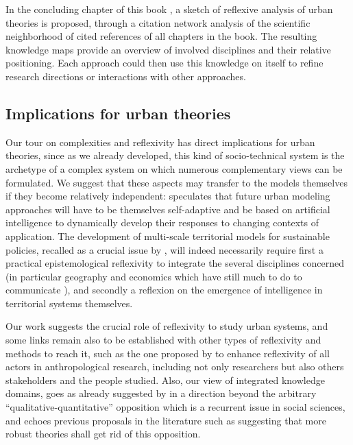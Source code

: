 \documentclass[graybox]{svmult}
\begin{document}
In the concluding chapter of this book \cite{pumain2019perspectives}, a sketch of reflexive analysis of urban theories is proposed, through a citation network analysis of the scientific neighborhood of cited references of all chapters in the book. The resulting knowledge maps provide an overview of involved disciplines and their relative positioning. Each approach could then use this knowledge on itself to refine research directions or interactions with other approaches.



\subsection{Implications for urban theories}


Our tour on complexities and reflexivity has direct implications for urban theories, since as we already developed, this kind of socio-technical system is the archetype of a complex system on which numerous complementary views can be formulated. We suggest that these aspects may transfer to the models themselves if they become relatively independent: \cite{white2017necessity} speculates that future urban modeling approaches will have to be themselves self-adaptive and be based on artificial intelligence to dynamically develop their responses to changing contexts of application. The development of multi-scale territorial models for sustainable policies, recalled as a crucial issue by \cite{rozenblat2018conclusion}, will indeed necessarily require first a practical epistemological reflexivity to integrate the several disciplines concerned (in particular geography and economics which have still much to do to communicate \cite{raimbault2017invisible}), and secondly a reflexion on the emergence of intelligence in territorial systems themselves.

Our work suggests the crucial role of reflexivity to study urban systems, and some links remain also to be established with other types of reflexivity and methods to reach it, such as the one proposed by \cite{anzoise2017perception} to enhance reflexivity of all actors in anthropological research, including not only researchers but also others stakeholders and the people studied. Also, our view of integrated knowledge domains, goes as already suggested by \cite{raimbault2017cadre} in a direction beyond the arbitrary ``qualitative-quantitative'' opposition which is a recurrent issue in social sciences, and echoes previous proposals in the literature such as \cite{shah2006building} suggesting that more robust theories shall get rid of this opposition.
\end{document}
